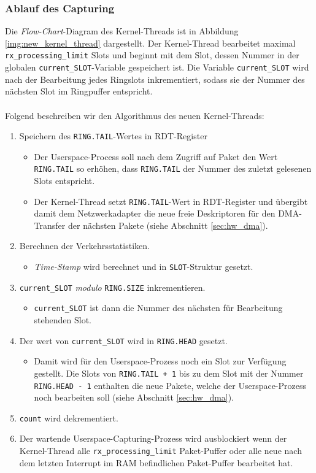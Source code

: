 \subsubsection*{Ablauf des Capturing}\label{sec:new_treiber_ablauf}
Die \emph{Flow-Chart}-Diagram des Kernel-Threads ist in Abbildung
\ref{img:new_kernel_thread} dargestellt. Der Kernel-Thread bearbeitet maximal
\verb+rx_processing_limit+ Slots und beginnt mit dem Slot, dessen Nummer in der globalen
\verb+current_SLOT+-Variable gespeichert ist. Die Variable \verb+current_SLOT+ 
wird nach der Bearbeitung jedes Ringslots inkrementiert, sodass sie 
der Nummer des nächsten Slot im Ringpuffer entspricht.\\\\
Folgend beschreiben wir den Algorithmus  des neuen Kernel-Threads: 
\begin{enumerate}
	\item Speichern des \verb+RING.TAIL+-Wertes in RDT-Register 
		\begin{itemize}
			\item Der Userspace-Process soll nach dem Zugriff auf Paket den Wert
				\verb+RING.TAIL+ so erhöhen, dass \verb+RING.TAIL+ der
				Nummer des zuletzt gelesenen Slots entspricht.
			\item Der Kernel-Thread setzt \verb+RING.TAIL+-Wert in 
				RDT-Register und übergibt damit dem  Netzwerkadapter die neue freie
				Deskriptoren für den DMA-Transfer der nächsten Pakete (siehe
				Abschnitt \ref{sec:hw_dma}). 
		\end{itemize}
	\item Berechnen der Verkehrsstatistiken. 
		\begin{itemize}
			\item \emph{Time-Stamp} wird berechnet und in \verb+SLOT+-Struktur gesetzt.
		\end{itemize}
	\item \verb+current_SLOT+ \emph{modulo} \verb+RING.SIZE+ inkrementieren.
		\begin{itemize}
			\item \verb+current_SLOT+ ist dann die Nummer des nächsten 
				für Bearbeitung stehenden Slot.
		\end{itemize}
	\item  Der wert von \verb+current_SLOT+ wird in \verb+RING.HEAD+ gesetzt. 
		\begin{itemize}
			\item Damit wird für den  Userspace-Prozess noch ein Slot zur Verfügung
				gestellt.  Die Slots von \verb-RING.TAIL + 1- bis zu dem Slot
				mit der Nummer \verb+RING.HEAD - 1+ enthalten die neue Pakete,
				welche der Userspace-Prozess noch bearbeiten soll (siehe
				Abschnitt \ref{sec:hw_dma}). 
		\end{itemize}
	\item \verb+count+ wird dekrementiert.
	\item Der wartende Userspace-Capturing-Prozess wird ausblockiert wenn 
		der Kernel-Thread alle \verb+rx_processing_limit+ Paket-Puffer
		oder alle neue nach dem letzten Interrupt im RAM befindlichen Paket-Puffer 
		bearbeitet hat.
\end{enumerate}
